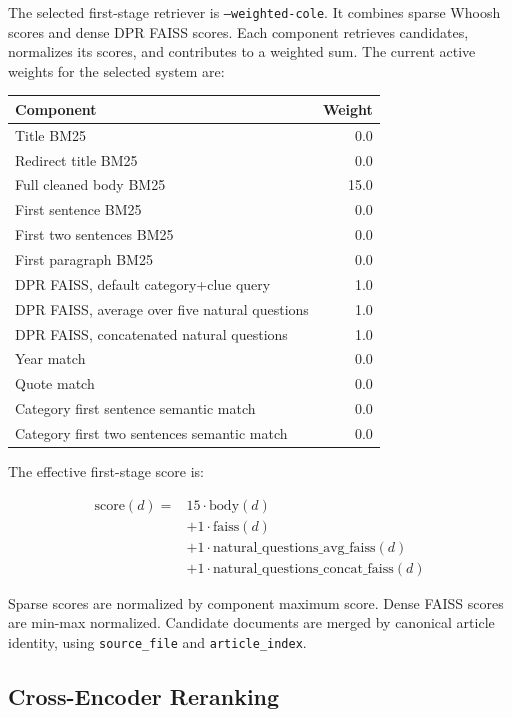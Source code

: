 \documentclass[11pt]{article}
\begin{document}
The selected first-stage retriever is \texttt{--weighted-cole}. It combines sparse Whoosh scores and dense DPR FAISS scores. Each component retrieves candidates, normalizes its scores, and contributes to a weighted sum. The current active weights for the selected system are:

\begin{table}[h]
\centering
\begin{tabular}{l r}
\toprule
Component & Weight \\
\midrule
Title BM25 & 0.0 \\
Redirect title BM25 & 0.0 \\
Full cleaned body BM25 & 15.0 \\
First sentence BM25 & 0.0 \\
First two sentences BM25 & 0.0 \\
First paragraph BM25 & 0.0 \\
DPR FAISS, default category+clue query & 1.0 \\
DPR FAISS, average over five natural questions & 1.0 \\
DPR FAISS, concatenated natural questions & 1.0 \\
Year match & 0.0 \\
Quote match & 0.0 \\
Category first sentence semantic match & 0.0 \\
Category first two sentences semantic match & 0.0 \\
\bottomrule
\end{tabular}
\end{table}

The effective first-stage score is:

\[
\begin{aligned}
\text{score}(d) ={}& 15 \cdot \text{body}(d) \\
&+ 1 \cdot \text{faiss}(d) \\
&+ 1 \cdot \text{natural\_questions\_avg\_faiss}(d) \\
&+ 1 \cdot \text{natural\_questions\_concat\_faiss}(d)
\end{aligned}
\]

Sparse scores are normalized by component maximum score. Dense FAISS scores are min-max normalized. Candidate documents are merged by canonical article identity, using \texttt{source\_file} and \texttt{article\_index}.

\subsection{Cross-Encoder Reranking}
\end{document}

